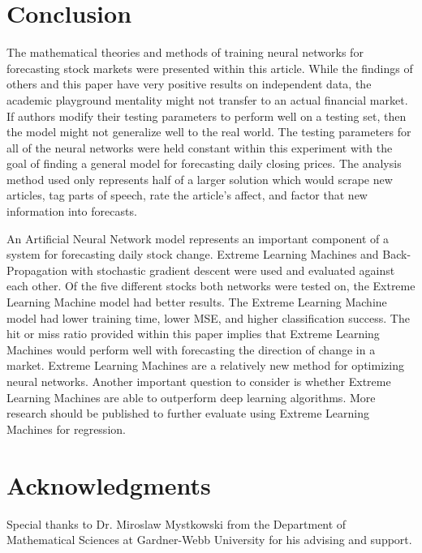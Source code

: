 \documentclass{ncjms}
\begin{document}
	\section{Conclusion}\label{sec:conclusion}
	The mathematical theories and methods of training neural networks for forecasting stock markets were presented within this article.
	While the findings of others and this paper have very positive results on independent data, the academic playground mentality might not transfer to an actual financial market.
	If authors modify their testing parameters to perform well on a testing set, then the model might not generalize well to the real world.
	The testing parameters for all of the neural networks were held constant within this experiment with the goal of finding a general model for forecasting daily closing prices.
	The analysis method used only represents half of a larger solution which would scrape new articles, tag parts of speech, rate the article's affect, and factor that new information into forecasts.

	An Artificial Neural Network model represents an important component of a system for forecasting daily stock change.
	Extreme Learning Machines and Back-Propagation with stochastic gradient descent were used and evaluated against each other.
	Of the five different stocks both networks were tested on, the Extreme Learning Machine model had better results.
	The Extreme Learning Machine model had lower training time, lower MSE, and higher classification success.
	The hit or miss ratio provided within this paper implies that Extreme Learning Machines would perform well with forecasting the direction of change in a market.
	Extreme Learning Machines are a relatively new method for optimizing neural networks.
	Another important question to consider is whether Extreme Learning Machines are able to outperform deep learning algorithms.
	More research should be published to further evaluate using Extreme Learning Machines for regression.

	\section*{Acknowledgments}
	Special thanks to Dr. Miroslaw Mystkowski from the Department of Mathematical Sciences at Gardner-Webb University for his advising and support.

	
	
\end{document}
